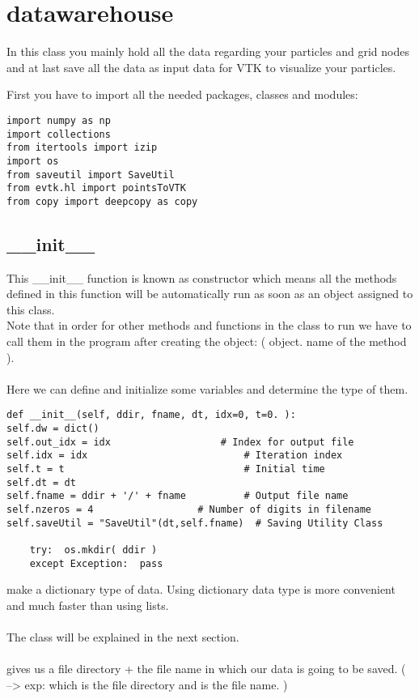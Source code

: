 \chapter{datawarehouse}
\label{chap:datawarehouse}
In this class you mainly hold all the data regarding your particles and grid nodes and at last save all the data as input data for VTK to visualize your particles.

First you have to import all the needed packages, classes and modules:
\begin{lstlisting}
import numpy as np
import collections
from itertools import izip
import os
from saveutil import SaveUtil
from evtk.hl import pointsToVTK
from copy import deepcopy as copy
\end{lstlisting}
\section{\_\_init\_\_}
This \_\_init\_\_ function is known as constructor which means all the methods defined in this function will be automatically run as soon as an object assigned to this class. \\
Note that in order for other methods and functions in the class to run we have to call them in the program after creating the object: ( object. name of the method ). \\ \\
Here we can define and initialize some variables and determine the type of them. 

\begin{lstlisting}
def __init__(self, ddir, fname, dt, idx=0, t=0. ):
self.dw = dict()
self.out_idx = idx                   # Index for output file
self.idx = idx                           # Iteration index
self.t = t                               # Initial time
self.dt = dt
self.fname = ddir + '/' + fname          # Output file name
self.nzeros = 4                  # Number of digits in filename
self.saveUtil = "SaveUtil"(dt,self.fname)  # Saving Utility Class
	
	try:  os.mkdir( ddir )	    
	except Exception:  pass	
\end{lstlisting}
 make a dictionary type of data. Using dictionary data type is more convenient and much faster than using lists.\\ \\ 
The  class will be explained in the next section.\\ \\
 gives us a file directory + the file name in which our data is going to be saved. ( --> exp:  which  is the file directory and  is the file name. )
